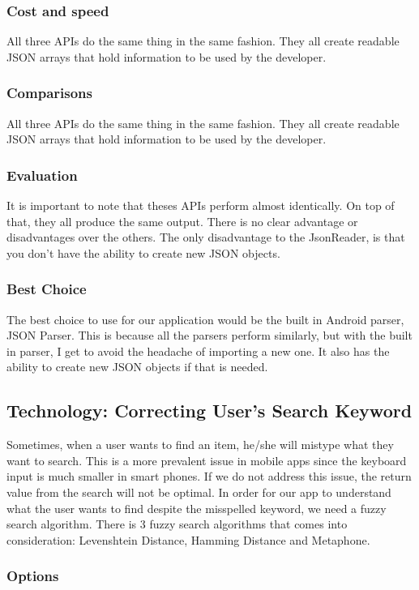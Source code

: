 \documentclass[journal,compsoc, 10pt, draftclsnofoot, onecolumn]{IEEEtran}
\begin{document}
\subsubsection{Cost and speed}
All three APIs do the same thing in the same fashion. They all create readable
JSON arrays that hold information to be used by the developer.

\subsubsection{Comparisons}
All three APIs do the same thing in the same fashion. They all create readable
JSON arrays that hold information to be used by the developer.

\subsubsection{Evaluation}
It is important to note that theses APIs perform almost identically. On top of
that, they all produce the same output. There is no clear advantage or
disadvantages over the others. The only disadvantage to the JsonReader, is that
you don't have the ability to create new JSON objects.

\subsubsection{Best Choice}
The best choice to use for our application would be the built in Android parser,
JSON Parser. This is because all the parsers perform similarly, but with the
built in parser, I get to avoid the headache of importing a new one. It also has
the ability to create new JSON objects if that is needed.

\subsection{Technology: Correcting User's Search Keyword}
Sometimes, when a user wants to find an item, he/she will mistype what they want to
search. This is a more prevalent issue in mobile apps since the keyboard input is
much smaller in smart phones. If we do not address this issue, the return value from
the search will not be optimal. In order for our app to understand what the user
wants to find despite the misspelled keyword, we need a fuzzy search algorithm.
There is 3 fuzzy search algorithms that comes into consideration: Levenshtein
Distance, Hamming Distance and Metaphone.

\subsubsection{Options}
\end{document}

